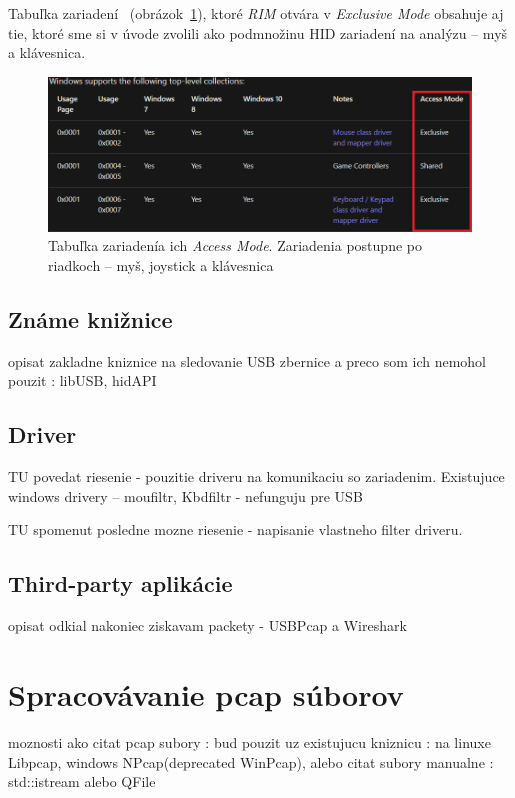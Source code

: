 Tabuľka zariadení~\cite{hid_access} (obrázok~\ref{obr:kap3:access_mode}), ktoré \textit{RIM} otvára v \textit{Exclusive Mode} obsahuje aj tie, ktoré sme si v úvode zvolili ako podmnožinu HID zariadení na analýzu -- myš a klávesnica.

\begin{figure}[!htb]
	\centering
	\includegraphics[width=\textwidth]{img/kap3_access_mode}
	\caption{Tabuľka zariadenía ich \textit{Access Mode}. Zariadenia postupne po riadkoch -- myš, joystick a klávesnica}
	\label{obr:kap3:access_mode}
\end{figure}

\newpage

\subsection{Známe knižnice}
opisat zakladne kniznice na sledovanie USB zbernice a preco som ich nemohol pouzit : libUSB, hidAPI

\subsection{Driver}
TU povedat riesenie - pouzitie driveru na komunikaciu so zariadenim. Existujuce windows drivery -- moufiltr, Kbdfiltr - nefunguju pre USB

TU spomenut posledne mozne riesenie - napisanie vlastneho filter driveru. 

\subsection{Third-party aplikácie}
opisat odkial nakoniec ziskavam packety - USBPcap a Wireshark









\section{Spracovávanie pcap súborov}
moznosti ako citat pcap subory : bud pouzit uz existujucu kniznicu : na linuxe Libpcap, windows NPcap(deprecated WinPcap), alebo citat subory manualne : std::istream alebo QFile
